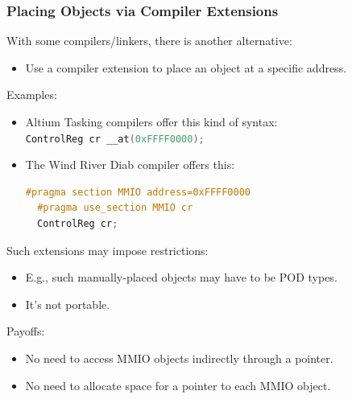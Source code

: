 \subsubsection{Placing Objects via Compiler Extensions}
With some compilers/linkers, there is another alternative:
\begin{itemize}
  \item Use a compiler extension to place an object at a specific address.
\end{itemize}
Examples:
\begin{itemize}
  \item Altium Tasking compilers offer this kind of syntax:\\
  \lstinline[language=C++]{ControlReg cr __at(0xFFFF0000);}
  \item The Wind River Diab compiler offers this:\\
  \begin{lstlisting}[language=C++]
  #pragma section MMIO address=0xFFFF0000
  #pragma use_section MMIO cr
  ControlReg cr;
  \end{lstlisting}
\end{itemize}
Such extensions may impose restrictions:
\begin{itemize}
  \item E.g., such manually-placed objects may have to be POD types.
  \item It's not portable.
\end{itemize}
Payoffs:
\begin{itemize}
  \item No need to access MMIO objects indirectly through a pointer.
  \item No need to allocate space for a pointer to each MMIO object.
\end{itemize}

